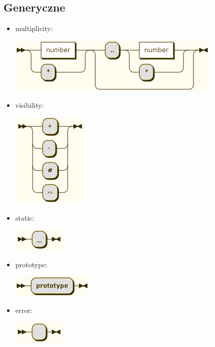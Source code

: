 \documentclass[a4paper,11pt,notitlepage]{article}
\begin{document}
\subsection{Generyczne}
\begin{itemize}
\item multiplicity:

\includegraphics[scale=0.66]{images/grammar/multiplicity.png}

\item visibility:

\includegraphics[scale=0.66]{images/grammar/visibility.png}

\item static:

\includegraphics[scale=0.66]{images/grammar/static.png}

\item prototype:

\includegraphics[scale=0.66]{images/grammar/prototype.png}

\item error:

\includegraphics[scale=0.66]{images/grammar/error.png}
\end{itemize}
\end{document}
